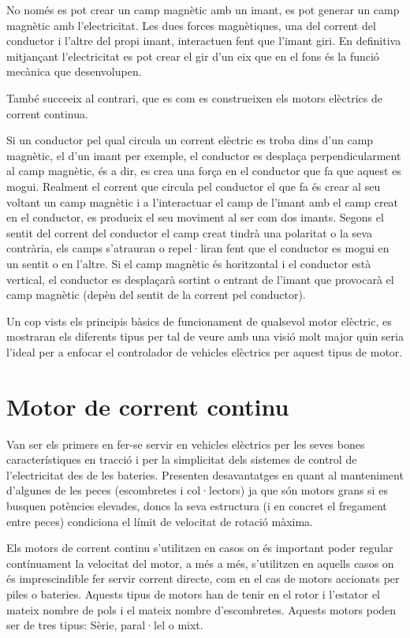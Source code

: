 No només es pot crear un camp magnètic amb un imant, es pot generar un camp magnètic amb l’electricitat. Les dues forces magnètiques, una del corrent del conductor i l’altre del propi imant, interactuen fent que l’imant giri. En definitiva mitjançant l’electricitat es pot crear el gir d’un eix que en el fons és la funció mecànica que desenvolupen. 

També succeeix al contrari, que es com es construeixen els motors elèctrics de corrent continua.

Si un conductor pel qual circula un corrent elèctric es troba dins d’un camp magnètic, el d’un imant per exemple, el conductor es desplaça perpendicularment al camp magnètic, és a dir, es crea una força en el conductor que fa que aquest es mogui. Realment el corrent que circula pel conductor el que fa és crear al seu voltant un camp magnètic i a l’interactuar el camp de l’imant amb el camp creat en el conductor, es produeix el seu moviment al ser com dos imants. Segons el sentit del corrent del conductor el camp creat tindrà una polaritat o la seva contrària, els camps s’atrauran o repel·liran fent que el conductor es mogui en un sentit o en l’altre.
Si el camp magnètic és horitzontal i el conductor està vertical, el conductor es desplaçarà sortint o entrant de l’imant que provocarà el camp magnètic (depèn del sentit de la corrent pel conductor).

Un cop vists els principis bàsics de funcionament de qualsevol motor \newline elèctric, es mostraran els diferents tipus per tal de veure amb una visió molt major quin seria l'ideal per a enfocar el controlador de vehicles \newline elèctrics per aquest tipus de motor.

\section{Motor de corrent continu}

Van ser els primers en fer-se servir en vehicles elèctrics per les seves bones característiques en tracció i per la simplicitat dels sistemes de control de l'electricitat des de les bateries. Presenten desavantatges en quant al manteniment d'algunes de les peces (escombretes i col·lectors) ja que són motors grans si es busquen potències elevades, doncs la seva estructura (i en concret el fregament entre peces) condiciona el límit de velocitat de rotació màxima. 

Els motors de corrent continu s'utilitzen en casos on és important poder regular contínuament la velocitat del motor, a més a més, s'utilitzen en aquells casos on és imprescindible fer servir corrent directe, com en el cas de motors accionats per piles o bateries. Aquests tipus de motors han de tenir en el rotor i l'estator el mateix nombre de pols i el mateix nombre d'escombretes. Aquests motors poden ser de tres tipus: Sèrie, paral·lel o mixt. 

